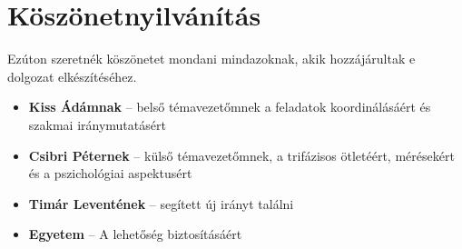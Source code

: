 
\section*{Köszönetnyilvánítás}
\label{sec:koszonet}

Ezúton szeretnék köszönetet mondani mindazoknak, akik hozzájárultak e dolgozat elkészítéséhez.

\begin{itemize}
    \item \textbf{Kiss Ádámnak} -- belső témavezetőmnek a feladatok koordinálásáért és szakmai iránymutatásért
    \item \textbf{Csibri Péternek} -- külső témavezetőmnek, a trifázisos ötletéért, mérésekért és a pszichológiai aspektusért
    \item \textbf{Timár Leventének} -- segített új irányt találni
    \item \textbf{Egyetem} -- A lehetőség biztosításáért
\end{itemize}

\clearpage